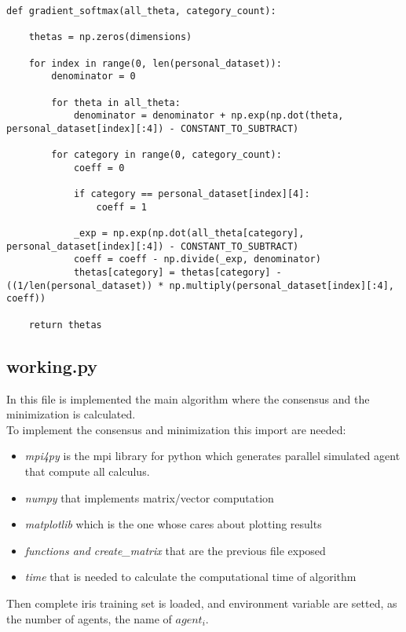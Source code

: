\documentclass[a4paper,11pt,oneside]{book}
\begin{document}
\begin{lstlisting}
def gradient_softmax(all_theta, category_count):

    thetas = np.zeros(dimensions)

    for index in range(0, len(personal_dataset)):
        denominator = 0

        for theta in all_theta:
            denominator = denominator + np.exp(np.dot(theta, personal_dataset[index][:4]) - CONSTANT_TO_SUBTRACT)

        for category in range(0, category_count):
            coeff = 0

            if category == personal_dataset[index][4]:
                coeff = 1

            _exp = np.exp(np.dot(all_theta[category], personal_dataset[index][:4]) - CONSTANT_TO_SUBTRACT)
            coeff = coeff - np.divide(_exp, denominator)
            thetas[category] = thetas[category] - ((1/len(personal_dataset)) * np.multiply(personal_dataset[index][:4], coeff))

    return thetas
\end{lstlisting}

\subsection {working.py}

In this file is implemented the main algorithm where the consensus and the minimization is calculated.\\

To implement the consensus and minimization this import are needed:
\begin{itemize}
    \item \textit{mpi4py} is the mpi library for python which generates parallel simulated agent that compute all calculus.
    \item \textit{numpy} that implements matrix/vector computation
    \item \textit{matplotlib} which is the one whose cares about plotting results
    \item \textit{functions and create\_matrix} that are the previous file exposed
    \item \textit{time} that is needed to calculate the computational time of algorithm 
\end{itemize} 

Then complete iris training set is loaded, and environment variable are setted, as the number of agents, the name of $agent_{i}$.
\end{document}
